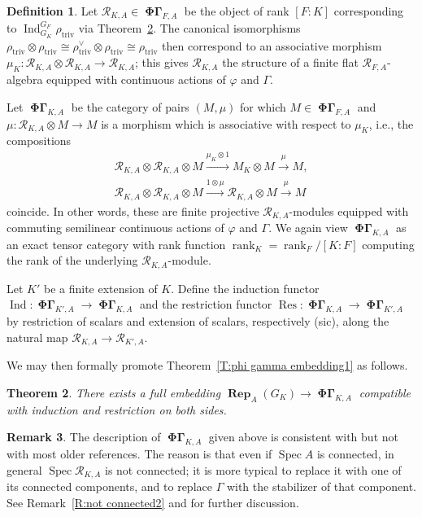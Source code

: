 \documentclass[12pt]{amsart}
\newtheorem{theorem}{Theorem}[section]
\theoremstyle{definition}
\newtheorem{defn}[theorem]{Definition}
\newtheorem{remark}[theorem]{Remark}
\numberwithin{equation}{theorem}
\newcommand{\calR}{\mathcal{R}}
\newcommand{\dual}{\vee}
\DeclareMathOperator{\Ind}{Ind}
\DeclareMathOperator{\PhiGamma}{\mathbf{\Phi \Gamma}}
\DeclareMathOperator{\rank}{rank}
\DeclareMathOperator{\Rep}{\mathbf{Rep}}
\DeclareMathOperator{\Res}{Res}
\DeclareMathOperator{\Spec}{Spec}
\DeclareMathOperator{\triv}{triv}
\begin{document}
\begin{defn}
Let $\calR_{K,A} \in \PhiGamma_{F,A}$ be the object of rank $[F:K]$ corresponding to $\Ind^{G_F}_{G_K} \rho_{\triv}$ via Theorem~\ref{T:phi gamma embedding}. The canonical isomorphisms $\rho_{\triv} \otimes \rho_{\triv} \cong \rho_{\triv}^\dual \otimes \rho_{\triv} \cong \rho_{\triv}$
then correspond to an associative morphism $\mu_K: \calR_{K,A} \otimes \calR_{K,A} \to \calR_{K,A}$; this gives $\calR_{K,A}$ the structure of a finite flat $\calR_{F,A}$-algebra equipped with continuous actions of $\varphi$ and $\Gamma$.

Let $\PhiGamma_{K,A}$ be the category of pairs $(M, \mu)$ for which $M \in \PhiGamma_{F,A}$
and $\mu: \calR_{K,A} \otimes M \to M$ is a morphism which is associative with respect to $\mu_K$, i.e., the compositions
\begin{gather*}
\calR_{K,A} \otimes \calR_{K,A}  \otimes M \stackrel{\mu_K \otimes 1}{\to} M_K \otimes M \stackrel{\mu}{\to} M, \\
\calR_{K,A} \otimes \calR_{K,A} \otimes M \stackrel{1 \otimes \mu}{\to} \calR_{K,A} \otimes  M \stackrel{\mu}{\to} M
\end{gather*}
coincide. 
In other words, these are finite projective $\calR_{K,A}$-modules equipped with commuting semilinear continuous actions of $\varphi$ and $\Gamma$.
We again view $\PhiGamma_{K,A}$ as an exact tensor category with rank function $\rank_K = \rank_F / [K:F]$ computing the rank of the underlying $\calR_{K,A}$-module.

Let $K'$ be a finite extension of $K$. Define the induction functor
$\Ind: \PhiGamma_{K',A} \to \PhiGamma_{K,A}$ 
and the restriction functor $\Res: \PhiGamma_{K,A} \to \PhiGamma_{K',A}$
by restriction of scalars and extension of scalars, respectively (sic), along the natural map $\calR_{K,A}  \to \calR_{K',A}$.
\end{defn}

We may then formally promote Theorem~\ref{T:phi gamma embedding1} as follows.
\begin{theorem} \label{T:phi gamma embedding}
There exists a full embedding $\Rep_A(G_K) \to \PhiGamma_{K,A}$ compatible with induction and restriction on both sides.
\end{theorem}

\begin{remark} \label{R:not connected}
The description of $\PhiGamma_{K,A}$ given above is consistent with \cite{kedlaya-new-phigamma} but not with most older references. The reason is that even if $\Spec A$ is connected, in general $\Spec \calR_{K,A}$ is not connected; it is more typical to replace it with one of its connected components, and to replace $\Gamma$ with the stabilizer of that component.
See Remark~\ref{R:not connected2} and \cite[Remark~2.2.12]{kedlaya-new-phigamma} for further discussion.
\end{remark}
\end{document}
